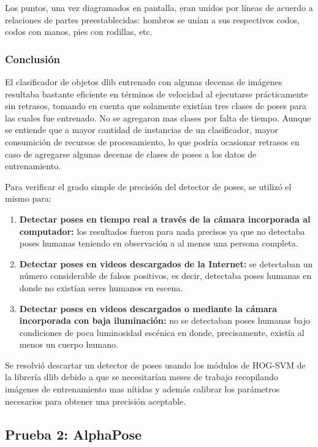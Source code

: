 \documentclass[a4paper,12pt,oneside,spanish]{book}
\begin{document}
Los puntos, una vez diagramados en pantalla, eran unidos por líneas de acuerdo a relaciones de partes preestablecidas: hombros se unían a sus respectivos codos, codos con manos, pies con rodillas, etc.\par

\subsubsection{Conclusión}
El clasificador de objetos dlib entrenado con algunas decenas de imágenes resultaba bastante eficiente en términos de velocidad al ejecutarse prácticamente sin retrasos, tomando en cuenta que solamente existían tres clases de poses para las cuales fue entrenado. No se agregaron mas clases por falta de tiempo. Aunque se entiende que a mayor cantidad de instancias de un clasificador, mayor consumición de recursos de procesamiento, lo que podría ocasionar retrasos en caso de agregarse algunas decenas de clases de poses a los datos de entrenamiento.\par

Para verificar el grado simple de precisión del detector de poses, se utilizó el mismo para:
 \begin{enumerate}\baselineskip 16pt	
 	\item \textbf{Detectar poses en tiempo real a través de la cámara incorporada al computador:} los resultados fueron para nada precisos ya que no detectaba poses humanas teniendo en observación a al menos una persona completa.
 	\item \textbf{Detectar poses en videos descargados de la Internet:} se detectaban un número considerable de falsos positivos, es decir, detectaba poses humanas en donde no existían seres humanos en escena.
	\item \textbf{Detectar poses en videos descargados o mediante la cámara incorporada con baja iluminación:} no se detectaban poses humanas bajo condiciones de poca luminosidad escénica en donde, precisamente, existía al menos un cuerpo humano.
\end{enumerate}	\baselineskip 16pt

Se resolvió descartar un detector de poses usando los módulos de HOG-SVM de la librería dlib debido a que se necesitarían meses de trabajo recopilando imágenes de entrenamiento mas nítidas y además calibrar los parámetros necesarios para obtener una precisión aceptable.\par

\subsection{Prueba 2: AlphaPose}
\end{document}
